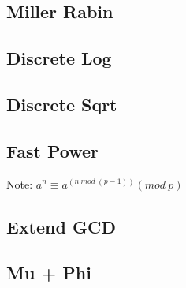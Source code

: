 \documentclass[a4paper,10pt,twocolumn,oneside]{article}
\begin{document}
\subsection{Miller Rabin}


\subsection{Discrete Log}

%

\subsection{Discrete Sqrt}

%

\subsection{Fast Power}
{ \normalsize
Note: $a^n \equiv a^{(n \ mod \ (p-1))} (mod \ p)$
}

\subsection{Extend GCD}


\subsection{Mu + Phi}

\end{document}
